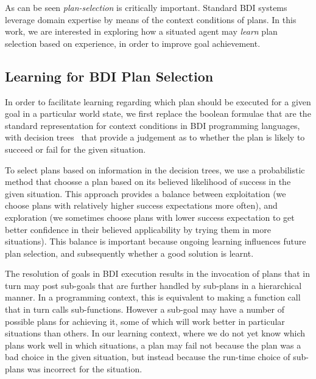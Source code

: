 As can be seen \textit{plan-selection} is critically important.
Standard BDI systems leverage domain
expertise by means of the context conditions of plans.
In this work, we are interested in exploring how a situated agent may
\emph{learn} plan selection based on experience, in order to improve goal
achievement. 


\subsection{Learning for BDI Plan Selection} \label{subsec:bdi_learning}
In order to facilitate learning regarding which plan should be
executed for a given goal in a particular world state, we first replace the
boolean formulae that are the standard representation for context
conditions in BDI programming languages, with decision
trees~\cite{Mitchell97:ML} that provide a judgement as to whether the
plan is likely to succeed or fail for the given situation. 

To select plans based on information in the decision trees, we use a
probabilistic method that choosse a plan based on its believed likelihood of success in the
given situation. This approach provides a balance between
exploitation (we choose plans with relatively higher success expectations
more often), and exploration (we sometimes choose plans with lower
success expectation to get better
confidence in their believed applicability by trying them in more 
situations).
%
This balance is important because ongoing learning influences future plan selection, and subsequently whether a good solution is learnt.


The resolution of goals in BDI execution results in 
the invocation of plans that in turn may post sub-goals that are further
handled by sub-plans in a hierarchical manner. In a programming context,
this is equivalent to making a function call that in turn calls sub-functions.
However a sub-goal may have a number of possible plans for achieving
it, some of which will work better in particular situations than
others. In our learning context, where we do not yet know which plans
work well in which situations, a plan may fail not because the plan
was a bad choice in the given situation, but instead because the
run-time choice of sub-plans was incorrect for the situation.

